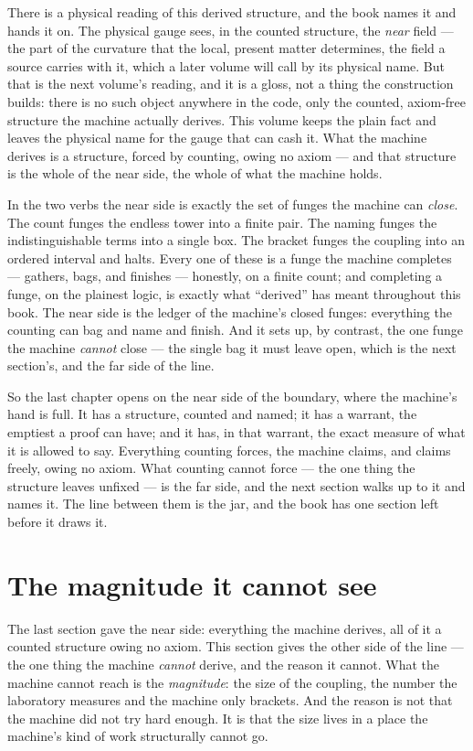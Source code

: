 There is a physical reading of this derived structure, and the book names it and hands it on. The physical gauge sees,
in the counted structure, the \emph{near} field --- the part of the curvature that the local, present matter
determines, the field a source carries with it, which a later volume will call by its physical name. But that is the
next volume's reading, and it is a gloss, not a thing the construction builds: there is no such object anywhere in the
code, only the counted, axiom-free structure the machine actually derives. This volume keeps the plain fact and leaves
the physical name for the gauge that can cash it. What the machine derives is a structure, forced by counting, owing no
axiom --- and that structure is the whole of the near side, the whole of what the machine holds.

In the two verbs the near side is exactly the set of funges the machine can \emph{close}. The count funges the endless
tower into a finite pair. The naming funges the indistinguishable terms into a single box. The bracket funges the
coupling into an ordered interval and halts. Every one of these is a funge the machine completes --- gathers, bags, and
finishes --- honestly, on a finite count; and completing a funge, on the plainest logic, is exactly what ``derived''
has meant throughout this book. The near side is the ledger of the machine's closed funges: everything the counting can
bag and name and finish. And it sets up, by contrast, the one funge the machine \emph{cannot} close --- the single bag
it must leave open, which is the next section's, and the far side of the line.

So the last chapter opens on the near side of the boundary, where the machine's hand is full. It has a structure,
counted and named; it has a warrant, the emptiest a proof can have; and it has, in that warrant, the exact measure of
what it is allowed to say. Everything counting forces, the machine claims, and claims freely, owing no axiom. What
counting cannot force --- the one thing the structure leaves unfixed --- is the far side, and the next section walks up
to it and names it. The line between them is the jar, and the book has one section left before it draws it.

\section{The magnitude it cannot see}

The last section gave the near side: everything the machine derives, all of it a counted structure owing no axiom.
This section gives the other side of the line --- the one thing the machine \emph{cannot} derive, and the reason it
cannot. What the machine cannot reach is the \emph{magnitude}: the size of the coupling, the number the laboratory
measures and the machine only brackets. And the reason is not that the machine did not try hard enough. It is that the
size lives in a place the machine's kind of work structurally cannot go.

